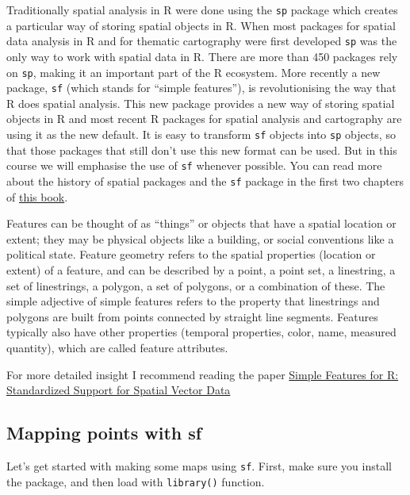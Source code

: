 \documentclass[
]{book}
\begin{document}
Traditionally spatial analysis in R were done using the \texttt{sp} package which creates a particular way of storing spatial objects in R. When most packages for spatial data analysis in R and for thematic cartography were first developed \texttt{sp} was the only way to work with spatial data in R. There are more than 450 packages rely on \texttt{sp}, making it an important part of the R ecosystem. More recently a new package, \texttt{sf} (which stands for ``simple features''), is revolutionising the way that R does spatial analysis. This new package provides a new way of storing spatial objects in R and most recent R packages for spatial analysis and cartography are using it as the new default. It is easy to transform \texttt{sf} objects into \texttt{sp} objects, so that those packages that still don't use this new format can be used. But in this course we will emphasise the use of \texttt{sf} whenever possible. You can read more about the history of spatial packages and the \texttt{sf} package in the first two chapters of \href{https://geocompr.robinlovelace.net}{this book}.

Features can be thought of as ``things'' or objects that have a spatial location or extent; they may be physical objects like a building, or social conventions like a political state. Feature geometry refers to the spatial properties (location or extent) of a feature, and can be described by a point, a point set, a linestring, a set of linestrings, a polygon, a set of polygons, or a combination of these. The simple adjective of simple features refers to the property that linestrings and polygons are built from points connected by straight line segments. Features typically also have other properties (temporal properties, color, name, measured quantity), which are called feature attributes.

For more detailed insight I recommend reading the paper \href{https://journal.r-project.org/archive/2018/RJ-2018-009/RJ-2018-009.pdf}{Simple Features for R: Standardized Support for Spatial Vector Data}

\hypertarget{mapping-points-with-sf}{%
\subsection{Mapping points with sf}\label{mapping-points-with-sf}}

Let's get started with making some maps using \texttt{sf}. First, make sure you install the package, and then load with \texttt{library()} function.
\end{document}
